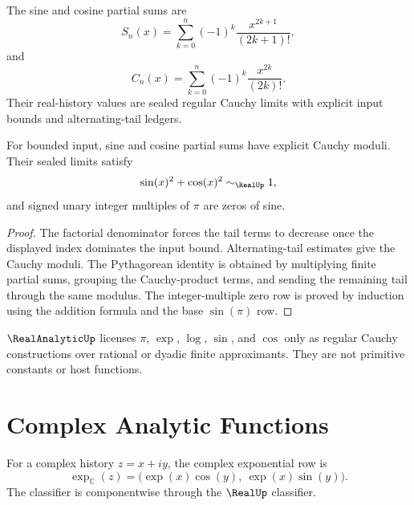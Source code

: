 \begin{definition}
\label{def:analysis-spine-trig-part}
The sine and cosine partial sums are
$$
S_n(x)=\sum_{k=0}^{n}(-1)^k\frac{x^{2k+1}}{(2k+1)!},
$$
and
$$
C_n(x)=\sum_{k=0}^{n}(-1)^k\frac{x^{2k}}{(2k)!}.
$$
Their real-history values are sealed regular Cauchy limits with explicit
input bounds and alternating-tail ledgers.
\end{definition}

\begin{theorem}
\label{thm:analysis-spine-trig-identities}
For bounded input, sine and cosine partial sums have explicit Cauchy moduli.
Their sealed limits satisfy
$$
\sin(x)^2+\cos(x)^2\sim_{\RealUp}1,
$$
and signed unary integer multiples of $\pi$ are zeros of sine.
\end{theorem}

\begin{proof}
The factorial denominator forces the tail terms to decrease once the
displayed index dominates the input bound.  Alternating-tail estimates give
the Cauchy moduli.  The Pythagorean identity is obtained by multiplying
finite partial sums, grouping the Cauchy-product terms, and sending the
remaining tail through the same modulus.  The integer-multiple zero row is
proved by induction using the addition formula and the base $\sin(\pi)$ row.
\end{proof}

\begin{principle}
\label{prin:analysis-spine-real-analytic-boundary}
$\RealAnalyticUp$ licenses $\pi$, $\exp$, $\log$, $\sin$, and $\cos$ only as
regular Cauchy constructions over rational or dyadic finite approximants.
They are not primitive constants or host functions.
\end{principle}

\section{Complex Analytic Functions}
\label{sec:analysis-spine-complex-analytic}

\begin{definition}
\label{def:analysis-spine-complex-exp}
For a complex history $z=x+i y$, the complex exponential row is
$$
\exp_{\mathbb C}(z)
=
\bigl(\exp(x)\cos(y),\ \exp(x)\sin(y)\bigr).
$$
The classifier is componentwise through the $\RealUp$ classifier.
\end{definition}


